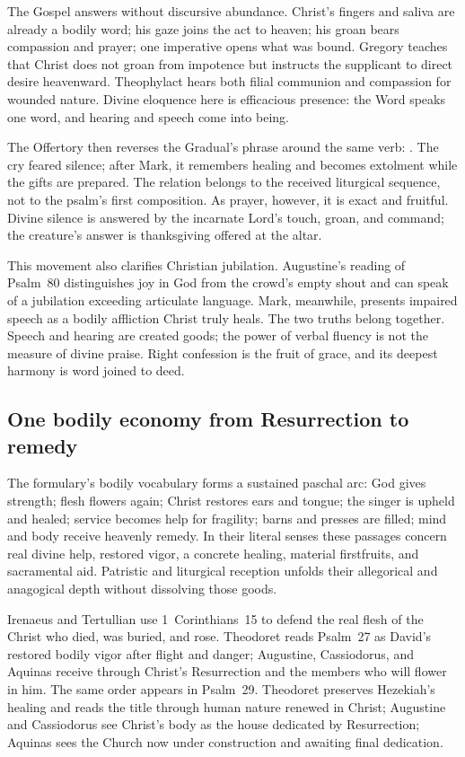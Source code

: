 The Gospel answers without discursive abundance. Christ's fingers and saliva
are already a bodily word; his gaze joins the act to heaven; his groan bears
compassion and prayer; one imperative opens what was bound. Gregory teaches
that Christ does not groan from impotence but instructs the supplicant to direct
desire heavenward. Theophylact hears both filial communion and compassion for
wounded nature. Divine eloquence here is efficacious presence: the Word speaks
one word, and hearing and speech come into being.

The Offertory then reverses the Gradual's phrase around the same verb:
. The cry feared silence; after
Mark, it remembers healing and becomes extolment while the gifts are prepared.
The relation belongs to the received liturgical sequence, not to the psalm's
first composition. As prayer, however, it is exact and
fruitful. Divine silence is answered by the incarnate Lord's touch, groan, and
command; the creature's answer is thanksgiving offered at the altar.

This movement also clarifies Christian jubilation. Augustine's reading of
Psalm~80 distinguishes joy in God from the crowd's empty shout and can speak of
a jubilation exceeding articulate language. Mark, meanwhile, presents impaired
speech as a bodily affliction Christ truly heals. The two truths belong
together. Speech and hearing are created goods; the power of verbal fluency is
not the measure of divine praise. Right confession is the fruit of grace, and
its deepest harmony is word joined to deed.

\subsection*{One bodily economy from Resurrection to remedy}

The formulary's bodily vocabulary forms a sustained paschal arc: God gives
strength; flesh flowers again; Christ restores ears and tongue; the singer is
upheld and healed; service becomes help for fragility; barns and presses are
filled; mind and body receive heavenly remedy. In their literal senses these
passages concern real divine help, restored vigor, a concrete healing,
material firstfruits, and sacramental aid. Patristic and liturgical reception
unfolds their allegorical and anagogical depth without dissolving those goods.

Irenaeus and Tertullian use 1~Corinthians~15 to defend the real flesh of the
Christ who died, was buried, and rose. Theodoret reads Psalm~27 as David's
restored bodily vigor after flight and danger; Augustine, Cassiodorus, and
Aquinas receive  through Christ's
Resurrection and the members who will flower in him. The same order appears in
Psalm~29. Theodoret preserves Hezekiah's healing and reads the title through
human nature renewed in Christ; Augustine and Cassiodorus see Christ's body as
the house dedicated by Resurrection; Aquinas sees the Church now under
construction and awaiting final dedication.

